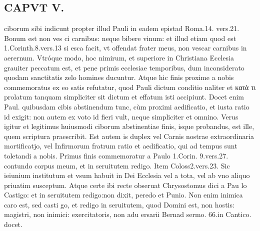 \documentclass{article}
\begin{document}
\begin{pages}
\section*{CAPVT V. }
\marginpar{[ p.375 ]}\pstart ciborum sibi indicunt propter illud Pauli in eadem epistad Roma.14. vers.21. Bonum est non ves ci carnibus: neque bibere vinum: et illud etiam quod est 1.Corinth.8.vers.13 si esca facit, vt offendat frater meus, non vescar carnibus in aerernum. Vtróque  modo, hoc nimirum, et superiore in Christiana Ecclesia grauiter peccatum est, et pene primis ecclesiae temporibus, dum inconsiderato quodam sanctitatis zelo homines ducuntur. Atque hic finis proxime a nobis commemoratus ex eo satis refutatur, quod Pauli dictum conditio naliter et κατὰ τι prolatum tanquam simpliciter sit dictum et effatum isti accipiunt. Docet enim Paul. quibusdam cibis abstinendum tunc, cùm proximi aedificatio, et iusta ratio id exigit: non autem ex voto id fieri vult, neque simpliciter et omnino. Verus igitur et legitimus huiusmodi ciborum abstinentiae finis, isque probandus, est ille, quem scriptura praescribit. Est autem is duplex vel Carnis nostrae extraordinaria mortificatjo, vel Infirmorum fratrum ratio et aedificatio, qui ad tempus sunt toletandi a nobis.  \pend\pstart Primus finis commemoratur a Paulo 1.Corin. 9.vers.27. contundo corpus meum, et in seruitutem redigo. Item Coloss2.vers.23. Sic ieiunium institutum et vsum habuit in Dei Ecclesia vel a tota, vel ab vno aliquo priuatim susceptum. Atque  certe ibi recte obseruat Chrysostomus dici a Pau lo Castigo: et in seruitutem redigo:non dixit, peredo et Punio. Non enim inimica caro est, sed casti go, et redigo in seruitutem, quod Domini est, non hostis: magistri, non inimici: exercitatoris, non adu ersarii Bernad sermo. 66.in Cantico. docet.  \pend

\end{pages}
\end{document}
